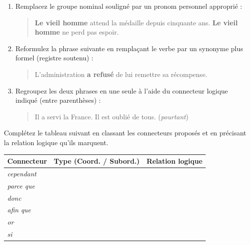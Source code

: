 \documentclass[11pt]{article}
\begin{document}
\begin{exercice}
\begin{enumerate}
    \item Remplacez le groupe nominal souligné par un pronom personnel approprié :
    \begin{quote}
    \textbf{Le vieil homme} attend la médaille depuis cinquante ans. \textbf{Le vieil homme} ne perd pas espoir.
    \end{quote}
    \item Reformulez la phrase suivante en remplaçant le verbe par un synonyme plus formel (registre soutenu) :
    \begin{quote}
    L'administration \textbf{a refusé} de lui remettre sa récompense.
    \end{quote}
    \item Regroupez les deux phrases en une seule à l'aide du connecteur logique indiqué (entre parenthèses) :
    \begin{quote}
    Il a servi la France. Il est oublié de tous. (\textit{pourtant})
    \end{quote}
\end{enumerate}
\end{exercice}

\begin{exercice}
Complétez le tableau suivant en classant les connecteurs proposés et en précisant la relation logique qu'ils marquent.

\begin{center}
\begin{tabularx}{\linewidth}{|X|c|X|}
\hline
\textbf{Connecteur} & \textbf{Type (Coord. / Subord.)} & \textbf{Relation logique} \\
\hline
\hline
\emph{cependant} &  &  \\
\hline
\emph{parce que} &  &  \\
\hline
\emph{donc} &  &  \\
\hline
\emph{afin que} &  &  \\
\hline
\emph{or} &  &  \\
\hline
\emph{si} &  &  \\
\hline
\end{tabularx}
\end{center}
\end{exercice}
\end{document}
